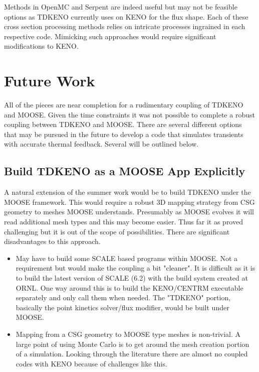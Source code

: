 \documentclass[11pt]{article}
\begin{document}
Methods in OpenMC and Serpent are indeed  useful but may not be feasible options as TDKENO  currently uses  on KENO for the flux shape.  Each of these cross section processing methods relies on intricate processes ingrained in each respective code.  Mimicking such approaches would require significant modifications to KENO.  



\section{Future Work}
All of the pieces are near  completion for a rudimentary coupling of TDKENO and MOOSE.  Given the time constraints it was not possible to complete a robust coupling between TDKENO and MOOSE.  There are several different options that may be pursued in the future to develop a code that simulates transients with accurate thermal feedback. Several will be outlined below. 

\subsection{Build TDKENO as a MOOSE App Explicitly}  
A natural extension of the summer work would be to build TDKENO under the MOOSE framework.  This would require a robust 3D mapping strategy from CSG geometry to meshes MOOSE understands.  Presumably as MOOSE evolves it will read additional mesh types and this may become easier.  Thus far it as proved challenging but it is out of the scope of possibilities.   
There are significant disadvantages to this approach.

\begin{itemize}
    \item May have to build some SCALE based programs within MOOSE. Not a requirement but would make the coupling a bit "cleaner".  It is difficult as it is to build the latest version of SCALE (6.2) with the build system created at ORNL. One way around this is to build the KENO/CENTRM executable separately and only call them when needed.  The "TDKENO" portion, basically the point kinetics solver/flux modifier, would be built under MOOSE.
    \item Mapping from a CSG geometry to MOOSE type meshes is non-trivial.  A large point of using Monte Carlo is to get around the mesh creation portion of a simulation. Looking through the literature there are almost no coupled codes with KENO because of challenges like this.   
\end{itemize}
\end{document}
